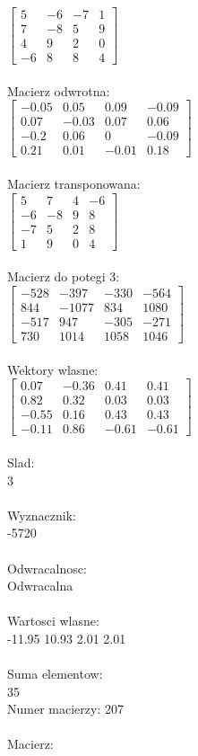 \documentclass[a4paper,12pt]{article}
\begin{document}
$\begin{bmatrix} 5&-6&-7&1\\7&-8&5&9\\4&9&2&0\\-6&8&8&4 \end{bmatrix}$
\\
\\
Macierz odwrotna:\\

$\begin{bmatrix} -0.05&0.05&0.09&-0.09\\0.07&-0.03&0.07&0.06\\-0.2&0.06&0&-0.09\\0.21&0.01&-0.01&0.18 \end{bmatrix}$
\\
\\
Macierz transponowana:\\

$\begin{bmatrix} 5&7&4&-6\\-6&-8&9&8\\-7&5&2&8\\1&9&0&4 \end{bmatrix}$
\\
\\
Macierz do potegi 3:\\

$\begin{bmatrix} -528&-397&-330&-564\\844&-1077&834&1080\\-517&947&-305&-271\\730&1014&1058&1046 \end{bmatrix}$
\\
\\
Wektory wlasne:\\

$\begin{bmatrix} 0.07&-0.36&0.41&0.41\\0.82&0.32&0.03&0.03\\-0.55&0.16&0.43&0.43\\-0.11&0.86&-0.61&-0.61 \end{bmatrix}$
\\
\\
Slad:\\
3
\\
\\
Wyznacznik:\\
-5720
\\
\\
Odwracalnosc:\\
Odwracalna
\\
\\
Wartosci wlasne:\\
-11.95 10.93 2.01 2.01
\\
\\
Suma elementow:\\
35
\\
\newpage
Numer macierzy:
207
\\
\\
Macierz:\\
\end{document}
